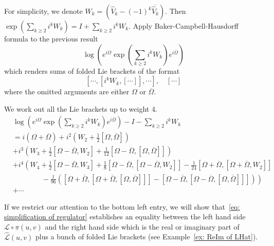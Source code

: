For simplicity, we denote $W_k=\left(\widehat V_k-(-1)^{k}\overline{\widehat V_k}\right)$. Then $\exp\left(\sum_{k\geq2}i^kW_k\right)=I+\sum_{k\geq2}i^kW_k$. Apply Baker-Campbell-Hausdorff formula to the previous result
\[
\log\left(e^{i\Omega}\exp\left(\sum_{k\geq2}i^kW_k\right)e^{i\overline\Omega}\right)
\]
which renders sums of folded Lie brackets of the format
\[
[\cdots,[i^kW_k,[\cdots]],\cdots],\quad [\cdots]
\]
where the omitted arguments are either $\Omega$ or $\overline\Omega$.

\begin{example}\label{ex: ReIm of LHat}
We work out all the Lie brackets up to weight 4.
\begin{equation}
\begin{aligned}
&\log\left(e^{i\Omega}\exp\left(\sum_{k\geq2}i^kW_k\right)e^{i\overline\Omega}\right)-I-\sum_{k\geq2}i^kW_k\\
&=i\left(\Omega+\overline\Omega\right)+i^2\left(W_2+\frac{1}{2}[\Omega,\overline\Omega]\right) \\
&+i^3\left(W_3+\frac{1}{2}[\Omega -\overline{\Omega},W_2]+\frac{1}{12}[\Omega -\overline{\Omega},[\Omega ,\overline{\Omega}]]\right) \\
&+i^4\left(
W_4+\frac{1}{2}[\Omega -\overline{\Omega},W_3]+\frac{1}{8}[\Omega -\overline{\Omega},[\Omega -\overline{\Omega},W_2]]-\frac{1}{24}[\Omega+\overline{\Omega},[\Omega+\overline{\Omega},W_2]]\right.\\
&\left.\qquad\qquad-\frac{1}{96}\left([\Omega+\overline{\Omega},[\Omega+\overline{\Omega},[\Omega ,\overline{\Omega}]]]-[\Omega-\overline{\Omega},[\Omega-\overline{\Omega},[\Omega ,\overline{\Omega}]]]\right)
\right)\\
&+\cdots
\end{aligned}
\end{equation}
\end{example}

If we restrict our attention to the bottom left entry, we will show that~\eqref{eq: simplification of regulator} establishes an equality between the left hand side $\mathcal L\circ\pi(u,v)$ and the right hand side which is the real or imaginary part of $\widehat{\mathcal L}(u,v)$ plus a bunch of folded Lie brackets (see Example~\ref{ex: ReIm of LHat}).

